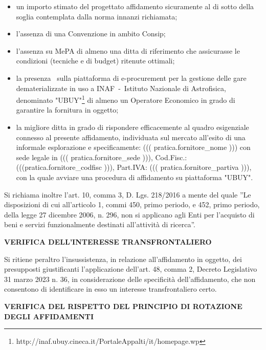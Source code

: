 \begin{itemize}

\item un importo stimato del progettato affidamento sicuramente al di sotto
della soglia contemplata dalla norma innanzi richiamata;

\item l’assenza di una Convenzione in ambito Consip;

\item l'assenza su MePA di almeno una ditta di riferimento che assicurasse
le condizioni (tecniche e di budget) ritenute ottimali;

\item la presenza  sulla piattaforma di e-procurement
per la gestione delle gare dematerializzate in uso a
INAF~-~Istituto Nazionale di Astrofisica, denominato
"UBUY"\footnote{http://inaf.ubuy.cineca.it/PortaleAppalti/it/homepage.wp}
di almeno un Operatore Economico in grado di garantire la fornitura in oggetto;

\item la migliore ditta in grado di rispondere efficacemente al quadro esigenziale
connesso al presente affidamento, individuata sul mercato all’esito di
una informale esplorazione e specificamente:
((( pratica.fornitore_nome ))) con sede legale in ((( pratica.fornitore_sede ))),
Cod.Fisc.: (((pratica.fornitore_codfisc ))), Part.IVA: ((( pratica.fornitore_partiva ))),
con la quale avviare una procedura di affidamento su piattaforma "UBUY".

\end{itemize}

Si richiama inoltre l’art. 10, comma 3, D. Lgs. 218/2016 a mente
del quale ''Le disposizioni di cui all'articolo 1, commi 450, primo
periodo, e 452, primo periodo, della legge 27 dicembre 2006, n. 296, non
si applicano agli Enti per l'acquisto di beni e servizi funzionalmente
destinati all'attività di ricerca''.



\textbf{VERIFICA DELL’INTERESSE TRANSFRONTALIERO}

Si ritiene peraltro l’insussistenza, in relazione all’affidamento in
oggetto, dei presupposti giustificanti l’applicazione dell’art. 48,
comma 2, Decreto Legislativo 31 marzo 2023 n. 36, in considerazione delle
specificità dell’affidamento, che non consentono di identificare in
esso un interesse transfrontaliero certo. 

\textbf{VERIFICA DEL RISPETTO DEL PRINCIPIO DI ROTAZIONE DEGLI AFFIDAMENTI}

